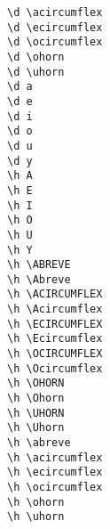 \begin{multicols}{2}
\X{\d \acircumflex} \verb|\d \acircumflex| \\
\X{\d \ecircumflex} \verb|\d \ecircumflex| \\
\X{\d \ocircumflex} \verb|\d \ocircumflex| \\
\X{\d \ohorn} \verb|\d \ohorn| \\
\X{\d \uhorn} \verb|\d \uhorn| \\
 \verb|\d a| \\
 \verb|\d e| \\
 \verb|\d i| \\
 \verb|\d o| \\
 \verb|\d u| \\
 \verb|\d y| \\
 \verb|\h A| \\
 \verb|\h E| \\
 \verb|\h I| \\
 \verb|\h O| \\
 \verb|\h U| \\
 \verb|\h Y| \\
\X{\h \ABREVE} \verb|\h \ABREVE| \\
\X{\h \Abreve} \verb|\h \Abreve| \\
\X{\h \ACIRCUMFLEX} \verb|\h \ACIRCUMFLEX| \\
\X{\h \Acircumflex} \verb|\h \Acircumflex| \\
\X{\h \ECIRCUMFLEX} \verb|\h \ECIRCUMFLEX| \\
\X{\h \Ecircumflex} \verb|\h \Ecircumflex| \\
\X{\h \OCIRCUMFLEX} \verb|\h \OCIRCUMFLEX| \\
\X{\h \Ocircumflex} \verb|\h \Ocircumflex| \\
\X{\h \OHORN} \verb|\h \OHORN| \\
\X{\h \Ohorn} \verb|\h \Ohorn| \\
\X{\h \UHORN} \verb|\h \UHORN| \\
\X{\h \Uhorn} \verb|\h \Uhorn| \\
\X{\h \abreve} \verb|\h \abreve| \\
\X{\h \acircumflex} \verb|\h \acircumflex| \\
\X{\h \ecircumflex} \verb|\h \ecircumflex| \\
\X{\h \ocircumflex} \verb|\h \ocircumflex| \\
\X{\h \ohorn} \verb|\h \ohorn| \\
\X{\h \uhorn} \verb|\h \uhorn| \\

\end{multicols}
